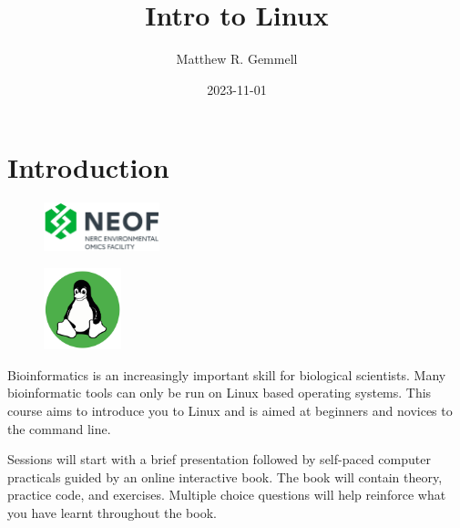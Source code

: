 \documentclass[
  letterpaper,
  DIV=11,
  numbers=noendperiod]{scrreprt}
\title{Intro to Linux}
\author{Matthew R. Gemmell}
\date{2023-11-01}
\renewcommand*\contentsname{Table of contents}
\newcommand\contentsname{Table of contents}
\begin{document}
\maketitle
\ifdefined\Shaded\renewenvironment{Shaded}{\begin{tcolorbox}[sharp corners, boxrule=0pt, borderline west={3pt}{0pt}{shadecolor}, interior hidden, enhanced, frame hidden, breakable]}{\end{tcolorbox}}\fi

\renewcommand*\contentsname{Table of contents}
{
\hypersetup{linkcolor=}
\setcounter{tocdepth}{2}
\tableofcontents
}

\hypertarget{intro}{%
\chapter{Introduction}\label{intro}}

\begin{figure}

{\centering \includegraphics[width=0.3\textwidth,height=\textheight]{figures/NEOF.png}

}

\end{figure}

\begin{figure}

{\centering \includegraphics[width=0.2\textwidth,height=\textheight]{figures/linux_beginner.png}

}

\end{figure}

Bioinformatics is an increasingly important skill for biological
scientists. Many bioinformatic tools can only be run on Linux based
operating systems. This course aims to introduce you to Linux and is
aimed at beginners and novices to the command line.

Sessions will start with a brief presentation followed by self-paced
computer practicals guided by an online interactive book. The book will
contain theory, practice code, and exercises. Multiple choice questions
will help reinforce what you have learnt throughout the book.
\end{document}
